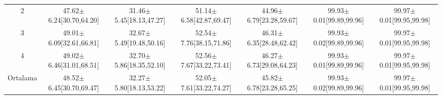 \begin{table}
\begin{adjustbox}{width=\textwidth}
\begin{tabular}{ccccccc}
            2 & 47.62$\pm$6.24[30.70,64.20] & 31.46$\pm$5.45[18.13,47.27] & 51.14$\pm$6.58[42.87,69.47] & 44.96$\pm$6.79[23.28,59.67] & 99.93$\pm$0.01[99.89,99.96] & 99.97$\pm$0.01[99.95,99.98] \\
            3 & 49.01$\pm$6.09[32.61,66.81] & 32.67$\pm$5.49[19.48,50.16] & 52.54$\pm$7.76[38.15,71.86] & 46.31$\pm$6.35[28.48,62.42] & 99.93$\pm$0.02[99.89,99.96] & 99.97$\pm$0.01[99.95,99.98] \\
            4 & 49.02$\pm$6.46[31.01,68.51] & 32.70$\pm$5.86[18.35,52.10] & 52.56$\pm$7.67[33.22,73.41] & 46.27$\pm$6.73[29.08,64.23] & 99.93$\pm$0.01[99.89,99.96] & 99.97$\pm$0.01[99.95,99.98] \\
			\toprule
			Ortalama & 48.52$\pm$6.45[30.70,69.47] & 32.27$\pm$5.80[18.13,53.22] & 52.05$\pm$7.61[33.22,74.27] & 45.82$\pm$6.78[23.28,65.25] & 99.93$\pm$0.02[99.89,99.96] & 99.97$\pm$0.01[99.95,99.98] \\		
			\bottomrule			
		\end{tabular}
	\end{adjustbox}	
\end{table}

